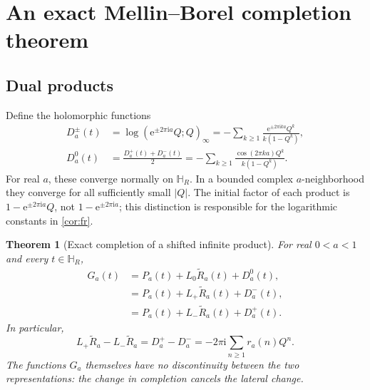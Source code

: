 \documentclass[11pt,a4paper]{article}
\numberwithin{equation}{section}
\newtheorem{theorem}{Theorem}[section]
\theoremstyle{definition}
\theoremstyle{remark}
\newcommand{\ii}{\mathrm i}
\newcommand{\e}{\mathrm e}
\newcommand{\wt}{\widetilde}
\begin{document}
\section{An exact Mellin--Borel completion theorem}
\label{sec:completion}

\subsection{Dual products}
Define the holomorphic functions
\begin{align}
 D_a^\pm(t)&=\log(\e^{\pm2\pi\ii a}Q;Q)_\infty
 =-\sum_{k\geq1}\frac{\e^{\pm2\pi\ii ka}Q^k}{k(1-Q^k)},
 \label{eq:dual}\\
 D_a^0(t)&=\frac{D_a^+(t)+D_a^-(t)}2
 =-\sum_{k\geq1}\frac{\cos(2\pi ka)Q^k}{k(1-Q^k)}.
 \label{eq:dualmedian}
\end{align}
For real $a$, these converge normally on $\mathbb H_R$. In a bounded
complex $a$-neighborhood they converge for all sufficiently small $|Q|$.
The initial factor of each product is $1-\e^{\pm2\pi\ii a}Q$, not
$1-\e^{\pm2\pi\ii a}$; this distinction is responsible for the
logarithmic constants in \cref{cor:fr}.

\begin{theorem}[Exact completion of a shifted infinite product]
\label{thm:completion}
For real $0<a<1$ and every $t\in\mathbb H_R$,
\begin{align}
 G_a(t)&=P_a(t)+L_0\wt R_a(t)+D_a^0(t),
 \label{eq:completion0}\\
 &=P_a(t)+L_+\wt R_a(t)+D_a^-(t),
 \label{eq:completionplus}\\
 &=P_a(t)+L_-\wt R_a(t)+D_a^+(t).
 \label{eq:completionminus}
\end{align}
In particular,
\begin{equation}
 L_+\wt R_a-L_-\wt R_a
 =D_a^+-D_a^-=-2\pi\ii\sum_{n\geq1}r_a(n)Q^n.
 \label{eq:jump}
\end{equation}
The functions $G_a$ themselves have no discontinuity between the two
representations: the change in completion cancels the lateral change.
\end{theorem}
\end{document}
